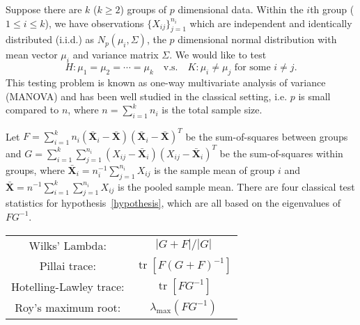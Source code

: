 \documentclass[review]{elsarticle}
\DeclareMathOperator{\mytr}{tr}
\newcommand{\bX}{\mathbf{X}}
\theoremstyle{plain}
\theoremstyle{definition}
\theoremstyle{remark}
\begin{document}
Suppose there are $k$ ($k\geq 2$) groups of $p$ dimensional data.
Within the $i$th group ($1\leq i\leq k$), we have observations $\{X_{ij}\}_{j=1}^{n_i}$ which are independent and identically distributed (i.i.d.) as $N_p(\mu_i,\Sigma)$, the $p$ dimensional normal distribution with mean vector $\mu_i$ and variance matrix $\Sigma$.
We would like to test
\begin{equation}\label{hypothesis}
    H: \mu_1=\mu_2=\cdots=\mu_k\quad \text{v.s.}\quad K: \text{$\mu_i\neq \mu_j$ for some $i\neq j$}.
\end{equation}
This testing problem is known as one-way multivariate analysis of variance (MANOVA) and has been well studied in the classical setting, i.e. $p$ is small compared to $n$, where $n=\sum_{i=1}^k n_i$ is the total sample size.

Let $F=\sum_{i=1}^k n_i (\bar{\bX}_i-\bar{\bX})(\bar{\bX}_i-\bar{\bX})^T$ be the sum-of-squares between groups and $G=\sum_{i=1}^k \sum_{j=1}^{n_i}(X_{ij}-\bar{\bX}_i)(X_{ij}-\bar{\bX}_i)^T$ be the sum-of-squares within groups, where $\bar{\bX}_i=n_i^{-1}\sum_{j=1}^{n_i}X_{ij}$ is the sample mean of group $i$ and $\bar{\bX}=n^{-1}\sum_{i=1}^k\sum_{j=1}^{n_i}X_{ij}$ is the pooled sample mean.
   There are four classical test statistics for hypothesis~\eqref{hypothesis}, which are all based on the eigenvalues of $FG^{-1}$. 


       \begin{center}
       \begin{tabular}{|cc|}
           \hline
       {Wilks' Lambda:} & $|G+F|/|G|$\\
       {Pillai trace:} & $\mytr[F(G+F)^{-1}]$\\
       {Hotelling-Lawley trace:} & $\mytr[FG^{-1}]$\\
       {Roy's maximum root:} & $\lambda_{\max}(FG^{-1})$\\
           \hline
           \end{tabular}
       \end{center}
\end{document}

